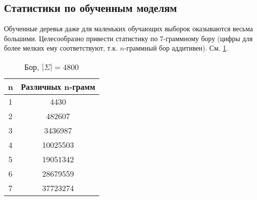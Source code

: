 \subsection{ Статистики по обученным моделям }

Обученные деревья даже для маленьких обучающих выборок оказываются весьма большими. Целесообразно привести статистику по 7-граммному бору (цифры для более мелких ему соответствуют, т.к. $n$-граммный бор аддитивен). См. \cref{table:trie}.

\begin{table}[H]
\begin{center}
	\begin{tabular}{|c|c|} \hline
		n	& Различных n-грамм \\  \hline
		1		&4430 \\
		2		&482607\\
		3		&3436987\\
		4		&10025503\\
		5		&19051342\\
		6		&28679559\\
		7		&37723274\\ \hline
	\end{tabular}		
\caption{Бор, $|\Sigma| = 4800$}
\label{table:trie}
\end{center}
\end{table}